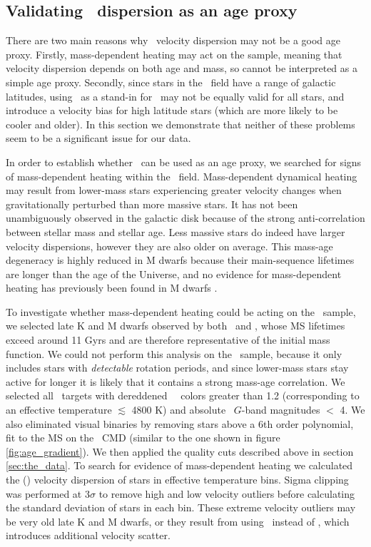 \subsection{Validating \vb\ dispersion as an age proxy}
\label{sec:mass-dependent-heating}

There are two main reasons why \vb\ velocity dispersion may not be a good age
proxy.
Firstly, mass-dependent heating may act on the sample, meaning that velocity
dispersion depends on both age and mass, so cannot be interpreted as a simple
age proxy.
Secondly, since stars in the \kepler\ field have a range of galactic
latitudes, using \vb\ as a stand-in for \vz\ may not be equally valid for all
stars, and introduce a velocity bias for high latitude stars (which are more
likely to be cooler and older).
In this section we demonstrate that neither of these problems seem to be a
significant issue for our data.

In order to establish whether \sigmavb\ can be used as an age proxy, we
searched for signs of mass-dependent heating within the \kepler\ field.
Mass-dependent dynamical heating may result from lower-mass stars experiencing
greater velocity changes when gravitationally perturbed than more massive
stars.
It has not been unambiguously observed in the galactic disk because of the
strong anti-correlation between stellar mass and stellar age.
Less massive stars do indeed have larger velocity dispersions, however they
are also older on average.
This mass-age degeneracy is highly reduced in M dwarfs because their
main-sequence lifetimes are longer than the age of the Universe, and no
evidence for mass-dependent heating has previously been found in M dwarfs
\citep[\eg][]{faherty2009, newton2016}.

To investigate whether mass-dependent heating could be acting on the \kepler\
sample, we selected late K and M dwarfs observed by both \kepler\ and \gaia,
whose MS lifetimes exceed around 11 Gyrs and are therefore representative of
the initial mass function.
We could not perform this analysis on the \mct\ sample, because it only
includes stars with {\it detectable} rotation periods, and since lower-mass
stars stay active for longer it is likely that it contains a strong mass-age
correlation.
We selected all \kepler\ targets with dereddened \gaia\ \gcolor\ colors
greater than 1.2 (corresponding to an effective temperature $\lesssim$
4800 K) and absolute \gaia\ $G$-band magnitudes $<$ 4.
We also eliminated visual binaries by removing stars above a 6th order
polynomial, fit to the MS on the \gaia\ CMD (similar to the one shown in
figure \ref{fig:age_gradient}).
We then applied the quality cuts described above in section
\ref{sec:the_data}.
To search for evidence of mass-dependent heating we calculated the (\vb)
velocity dispersion of stars in effective temperature bins.
Sigma clipping was performed at 3$\sigma$ to remove high and low velocity
outliers before calculating the standard deviation of stars in each bin.
These extreme velocity outliers may be very old late K and M dwarfs, or they
result from using \vb\ instead of \vz, which introduces additional velocity
scatter.

